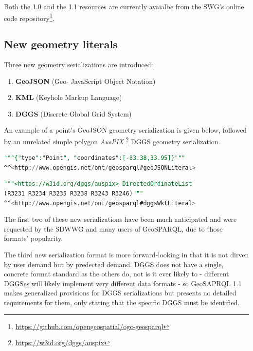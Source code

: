 \documentclass[runningheads]{llncs}
\begin{document}
Both the 1.0 and the 1.1 resources are currently avaialbe from the SWG's online code repository\footnote{\url{https://github.com/opengeospatial/ogc-geosparql}}.


\subsection{New geometry literals}\label{sec:newliterals}
Three new geometry serializations are introduced: 

\begin{enumerate}
    \item \textbf{GeoJSON} (Geo- JavaScript Object Notation)\cite{butler2016geojson}
    \item \textbf{KML} (Keyhole Markup Language)\cite{nolan2014keyhole} 
    \item \textbf{DGGS} (Discrete Global Grid System)\cite{sahr1998discrete}
\end{enumerate} 

An example of a point's GeoJSON geometry serialization is given below, followed by an unrelated simple polygon \textit{AusPIX}
\footnote{\url{https://w3id.org/dggs/auspix}} DGGS geometry serialization.

\small
\begin{lstlisting}[caption=GeoJSON geometry serialization example,label=lst:geojsonliteral,language=sql,frame=single,basicstyle=\ttfamily,showstringspaces=false]
"""{"type":"Point", "coordinates":[-83.38,33.95]}"""
^^<http://www.opengis.net/ont/geosparql#geoJSONLiteral>
\end{lstlisting}

\begin{lstlisting}[caption=AusPIX DGGS geometry serialization example,label=lst:geodggsWktliteral,language=sql,frame=single,basicstyle=\ttfamily,showstringspaces=false]
"""<https://w3id.org/dggs/auspix> DirectedOrdinateList 
(R3231 R3234 R3235 R3238 R3243 R3246)"""
^^<http://www.opengis.net/ont/geosparql#dggsWktLiteral>
\end{lstlisting}
\normalsize

The first two of these new serializations have been much anticipated and were requested by the SDWWG and many users of 
GeoSPARQL, due to those formats' popularity.

The third new serialization format is more forward-looking in that it is not dirven by user demand but by predected demand.
DGGS does not have a single, concrete format standard as the others do, not is it ever likely to - different DGGSes will 
likely implement very different data formats - so GeoSAPRQL 1.1 makes generalized provisions for DGGS serializations but 
presents no detailed requirements for them, only stating that the specific DGGS must be identified.
\end{document}

